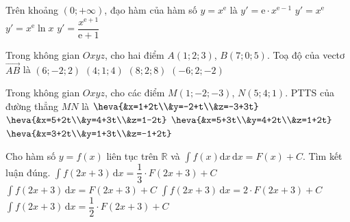 \begin{ex}%
	Trên khoảng $(0 ;+\infty)$, đạo hàm của hàm số $y=x^{\mathrm{e}}$ là	
	\choice
	{\True $y'=\mathrm{e}\cdot x^{\mathrm{e}-1}$}
	{$y'=x^{\mathrm{e}}$}
	{$y'=x^{\mathrm{e}}\ln x$}
	{$y'=\dfrac{x^{\mathrm{e}+1}}{\mathrm{e}+1}$}
\end{ex}
\begin{ex}%
	Trong không gian $Oxyz$, cho hai điểm $A(1 ; 2 ; 3)$, $B(7 ; 0 ; 5)$. Toạ độ của vectơ $\overrightarrow{A B}$ là	
	\choice
	{\True $(6;-2;2)$}
	{$(4;1;4)$}
	{$(8;2;8)$}
	{$(-6;2;-2)$}
\end{ex}
\begin{ex}%
	Trong không gian $O x y z$, cho các điểm $M(1 ;-2 ;-3)$, $N(5 ; 4 ; 1)$. PTTS của đường thẳng $M N$ là	
	\choice
	{$\heva{&x=1+2t\\&y=-2+t\\&z=-3+3t}$}
	{$\heva{&x=5+2t\\&y=4+3t\\&z=1-2t}$}
	{ $\heva{&x=5+3t\\&y=4+2t\\&z=1+2t}$}
	{\True$\heva{&x=3+2t\\&y=1+3t\\&z=-1+2t}$}
\end{ex}
\begin{ex}%
	Cho hàm số $y=f(x)$ liên tục trên $\mathbb{R}$ và $\displaystyle\int\limits f(x) \mathrm{d} x\mathrm{\,d} x=F(x)+C$. Tìm kết luận đúng.	
	\choice
	{$\displaystyle\int\limits f(2 x+3) \mathrm{\,d} x=\dfrac{1}{3} \cdot F(2 x+3)+C$}
	{$\displaystyle\int\limits f(2 x+3) \mathrm{\,d} x=F(2 x+3)+C$}
	{$\displaystyle\int\limits f(2 x+3) \mathrm{\,d} x=2 \cdot F(2 x+3)+C$}
	{\True $\displaystyle\int\limits f(2 x+3) \mathrm{\,d} x=\dfrac{1}{2} \cdot F(2 x+3)+C$}
\end{ex}
